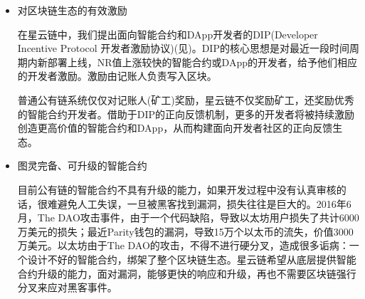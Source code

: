 \begin{itemize}
	\item 对区块链生态的有效激励

在星云链中，我们提出面向智能合约和DApp开发者的DIP(Developer Incentive Protocol 开发者激励协议)(见)。DIP的核心思想是对最近一段时间周期内新部署上线，NR值上涨较快的智能合约或DApp的开发者，给予他们相应的开发者激励。激励由记账人负责写入区块。

普通公有链系统仅仅对记账人(矿工)奖励，星云链不仅奖励矿工，还奖励优秀的智能合约开发者。借助于DIP的正向反馈机制，更多的开发者将被持续激励创造更高价值的智能合约和DApp，从而构建面向开发者社区的正向反馈生态。

	\item 图灵完备、可升级的智能合约

目前公有链的智能合约不具有升级的能力，如果开发过程中没有认真审核的话，很难避免人工失误，一旦被黑客找到漏洞，损失往往是巨大的。2016年6月，The DAO攻击事件，由于一个代码缺陷，导致以太坊用户损失了共计6000万美元的损失；最近Parity钱包的漏洞，导致15万个以太币的流失，价值3000万美元。以太坊由于The DAO的攻击，不得不进行硬分叉，造成很多诟病：一个设计不好的智能合约，绑架了整个区块链生态。星云链希望从底层提供智能合约升级的能力，面对漏洞，能够更快的响应和升级，再也不需要区块链强行分叉来应对黑客事件。

\end{itemize}

